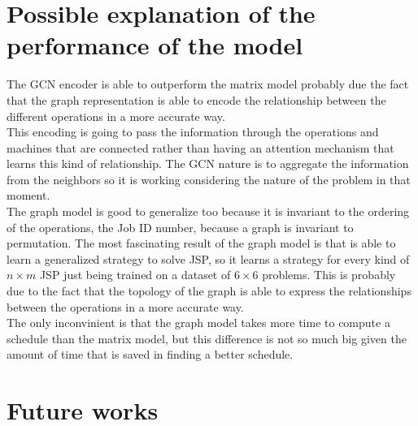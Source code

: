 \documentclass[12pt]{book}
\begin{document}
\section{Possible explanation of the performance of the model}
The GCN encoder is able to outperform the matrix model probably due the fact that the graph representation is able to encode the relationship between the different operations in a more accurate way.\\
This encoding is going to pass the information through the operations and machines that are connected rather than having an attention mechanism that learns this kind of relationship. The GCN nature is to aggregate the information from the neighbors so it is working considering the nature of the problem in that moment.\\
The graph model is good to generalize too because it is invariant to the ordering of the operations, the Job ID number, because a graph is invariant to permutation.
The most fascinating result of the graph model is that is able to learn a generalized strategy to solve JSP, so it learns a strategy for every kind of $n\times m$ JSP just being trained on a dataset of $6\times6$ problems. This is probably due to the fact that the topology of the graph is able to express the relationships between the operations in a more accurate way.\\
The only inconvinient is that the graph model takes more time to compute a schedule than the matrix model, but this difference is not so much big given the amount of time that is saved in finding a better schedule.

\section{Future works}
\end{document}
